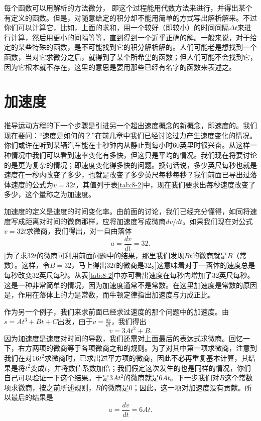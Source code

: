 \documentclass[12pt,oneside]{book}
\begin{document}
\begin{common-format}
每个函数可以用解析的方法微分， 即这个过程能用代数方法来进行，并得出某个有定义的函数。但是，对随意给定的积分却不能用简单的方式写出解析解来。不过你们可以计算它，比如，上面的求和，用一个较好（即较小）的时间间隔$\Delta t$来进行计算，然后用更小的间隔等等，直到得到一个近乎正确的解。一般来说，对于给定的某些特殊的函数，是不可能找到它的积分解析解的。人们可能老是想找到一个函数，当对它求微分之后，就得到了某个所希望的函数；但人们可能不会找到它，因为它根本就不存在，这里的意思是要用那些已经有名字的函数来表述之。




\section{加速度}
推导运动方程的下一个步骤是引进另一个超出速度概念的新概念，即速度的。我们现在要问：“速度是如何的？”在前几章中我们已经讨论过力产生速度变化的情况。你们或许在听到某辆汽车能在十秒钟内从静止到每小时60英里时很兴奋。从这样一种情况中我们可以看到速率变化有多快，但这只是平均的情况。我们现在将要讨论的是更为复杂的情况；即速度变化得多快的问题。换句话说，多少英尺每秒也就是速度在一秒内改变了多少，也就是改变了多少英尺每秒每秒？我们前面已导出过落体速度的公式为$v=32t$，其值列于表\ref{tab:8-2}中，现在我们要求出每秒速度改变了多少，这个量称之为加速度。

加速度的定义是速度的时间变化率。由前面的讨论，我们已经充分懂得，如同将速度写成距离对时间的微商那样，应将加速度写成微商$dv/dt$。如果我们现在对公式$v=32t$求微商，我们得出，对一自由落体
\begin{equation}
\label{Eq:I:8:9}
a=\frac{dv}{dt}=32.
\end{equation}
[为了求$32t$的微商可利用前面问题中的结果，那里我们发现$Bt$的微商就是$B$（常数）。这样，令$B=32$，马上得出$32t$的微商是32。]这意味着对于一落体的速度总是每秒改变32英尺每秒。从表\ref{tab:8-2}中亦可看出速度在每秒内增加了32英尺每秒。这是一种非常简单的情况，因为加速度通常不是常数。在这里加速度是常数的原因是，作用在落体上的力是常数，而牛顿定律指出加速度与力成正比。

作为另一个例子，我们来求前面已经求过速度的那个问题中的加速度。由$s=At^3+Bt+C$出发，由于$v=\frac{ds}{dt}$，我们得出
\begin{equation*}
v=3At^2+B.
\end{equation*}
因为加速度是速度对时间的导数，我们还需对上面最后的表达式求微商。回忆一下，右方两项的微商等于各项微商之和的规则。为了对其中第一项求微商，注意到我们在对$16t^2$求微商时，已求出过平方项的微商，因此不必再重复基本计算，其结果是将$t^2$变成$t$，并将数值系数加倍；我们假定这次发生的也是同样的情况，你们自己可以验证一下这个结果。于是$3At^2$的微商就是$6At$。下一步我们对$B$这个常数项求微商，按之前所述规则，$B$的微商是0；因此，这一项对加速度没有贡献。所以最后的结果是
\begin{equation*}
a=\frac{dv}{dt}=6At.
\end{equation*}


\end{common-format}
\end{document}
